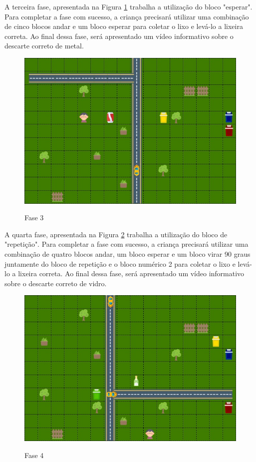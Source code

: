    A terceira fase, apresentada na Figura \ref{figura:fase_3} trabalha a utilização do bloco "esperar". Para completar a fase com sucesso, a criança precisará utilizar uma combinação de cinco blocos andar e um bloco esperar para coletar o lixo e levá-lo a lixeira correta. Ao final dessa fase, será apresentado um vídeo informativo sobre o descarte correto de metal.
    
    \begin{figure}[H]
        \caption{Fase 3}
        \centering
        \includegraphics[width=12cm]{Imagens/Cap3/Fases/Fase3.jpg}
        \label{figura:fase_3}
    \end{figure}
    
    A quarta fase, apresentada na Figura \ref{figura:fase_4} trabalha a utilização do bloco de "repetição". Para completar a fase com sucesso, a criança precisará utilizar uma combinação de quatro blocos andar, um bloco esperar e um bloco virar 90 graus juntamente do bloco de repetição e o bloco numérico 2 para coletar o lixo e levá-lo a lixeira correta. Ao final dessa fase, será apresentado um vídeo informativo sobre o descarte correto de vidro.
    
    \begin{figure}[H]
        \caption{Fase 4}
        \centering
        \includegraphics[width=12cm]{Imagens/Cap3/Fases/Fase4.jpg}
        \label{figura:fase_4}
    \end{figure}


